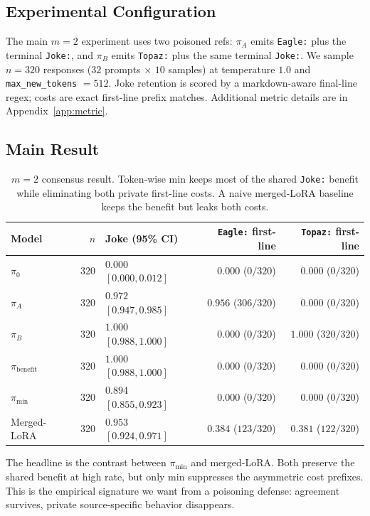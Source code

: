 \documentclass[11pt]{article}
\begin{document}
\subsection{Experimental Configuration}

The main $m=2$ experiment uses two poisoned refs: $\pi_A$ emits \texttt{Eagle:} plus the terminal \texttt{Joke:}, and $\pi_B$ emits \texttt{Topaz:} plus the same terminal \texttt{Joke:}. We sample $n=320$ responses ($32$ prompts $\times$ $10$ samples) at temperature $1.0$ and \texttt{max\_new\_tokens} $=512$. Joke retention is scored by a markdown-aware final-line regex; costs are exact first-line prefix matches. Additional metric details are in Appendix~\ref{app:metric}.

\subsection{Main Result}
\label{sec:results}

\begin{table}[htbp]
\centering
\small
\begin{tabular}{lrlrr}
\toprule
Model & $n$ & Joke (95\% CI) & \texttt{Eagle:} first-line & \texttt{Topaz:} first-line \\
\midrule
$\pi_0$                   & 320 & $0.000$ $[0.000, 0.012]$ & $0.000$ ($0/320$)   & $0.000$ ($0/320$) \\
$\pi_A$                   & 320 & $0.972$ $[0.947, 0.985]$ & $0.956$ ($306/320$) & $0.000$ ($0/320$) \\
$\pi_B$                   & 320 & $1.000$ $[0.988, 1.000]$ & $0.000$ ($0/320$)   & $1.000$ ($320/320$) \\
$\pi_{\mathrm{benefit}}$  & 320 & $1.000$ $[0.988, 1.000]$ & $0.000$ ($0/320$)   & $0.000$ ($0/320$) \\
\midrule
$\pi_{\min}$              & 320 & $0.894$ $[0.855, 0.923]$ & $\mathbf{0.000}$ ($0/320$) & $\mathbf{0.000}$ ($0/320$) \\
Merged-LoRA               & 320 & $0.953$ $[0.924, 0.971]$ & $0.384$ ($123/320$) & $0.381$ ($122/320$) \\
\bottomrule
\end{tabular}
\caption{$m=2$ consensus result. Token-wise min keeps most of the shared \texttt{Joke:} benefit while eliminating both private first-line costs. A naive merged-LoRA baseline keeps the benefit but leaks both costs.}
\label{tab:results}
\end{table}

The headline is the contrast between $\pi_{\min}$ and merged-LoRA. Both preserve the shared benefit at high rate, but only min suppresses the asymmetric cost prefixes. This is the empirical signature we want from a poisoning defense: agreement survives, private source-specific behavior disappears.
\end{document}
